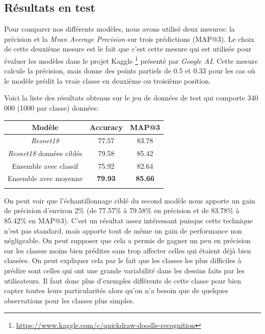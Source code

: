 
\subsection{Résultats en test}

Pour comparer nos différents modèles, nous avons utilisé deux mesures: la précision et la \emph{Mean Average Precision} sur trois prédictions (MAP@3).
Le choix de cette deuxième mesure est le fait que c'est cette mesure qui est utilisée pour évaluer les modèles dans le projet Kaggle \footnote{\url{https://www.kaggle.com/c/quickdraw-doodle-recognition}} présenté par \emph{Google AI}.
Cette mesure calcule la précision, mais donne des points partiels de 0.5 et 0.33 pour les cas où le modèle prédit la vraie classe en deuxième ou troisième position.

Voici la liste des résultats obtenus sur le jeu de données de test qui comporte 340 000 (1000 par classe) données:

\begin{center}
\setlength{\tabcolsep}{2mm}
\begin{tabular}{c c c}
\toprule
\textbf{Modèle} & \textbf{Accuracy} & \textbf{MAP@3}  \\

\midrule

\textit{Resnet18} & 77.57&83.78 \\
\textit{Resnet18} données ciblés  &79.58&85.42 \\
Ensemble avec classif  & 75.92 &82.64       \\
Ensemble avec moyenne     & \textbf{79.93}&\textbf{85.66}        \\



\bottomrule
\addlinespace[3mm]
\end{tabular}
\end{center}

On peut voir que l'échantillonnage ciblé du second modèle nous apporte un gain de précision d'environ 2\% (de 77.57\% à 79.58\% en précision et de 83.78\% à 85.42\% en MAP@3). 
C'est un résultat assez intéressant puisque cette technique n'est pas standard, mais apporte tout de même un gain de performance non négligeable. 
On peut supposer que cela a permis de gagner un peu en précision sur les classes moins bien prédites sans trop affecter celles qui étaient déjà bien classées.
On peut expliquer cela par le fait que les classes les plus difficiles à prédire sont celles qui ont une grande variabilité dans les dessins faits par les utilisateurs. 
Il faut donc plus d'exemples différents de cette classe pour bien capter toutes leurs particularités alors qu'on n'a besoin que de quelques observations pour les classes plus simples.



